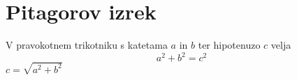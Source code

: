 \documentclass{article}
\begin{document}
\section*{Pitagorov izrek}
V pravokotnem trikotniku s katetama \(a\) in \(b\) ter hipotenuzo \(c\) velja
\[ a^2 + b^2 = c^2 \] \(c = \sqrt{a^2+b^2}\)
\end{document}
